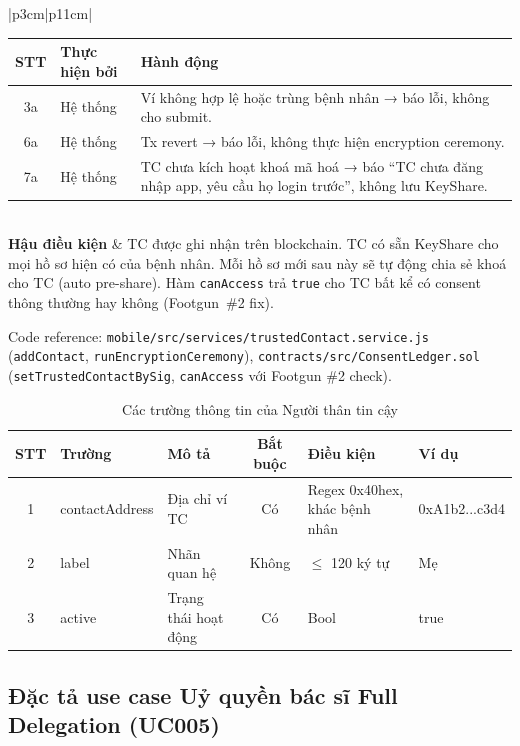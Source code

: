 \documentclass[../DoAn]{subfiles}
\begin{document}
\begin{table}[H]
\begin{tabular}{|p{3cm}|p{11cm}|}
\begin{tabular}{|c|p{2.3cm}|p{6cm}|}
\hline
\textbf{STT} & \textbf{Thực hiện bởi} & \textbf{Hành động} \\ \hline
3a & Hệ thống & Ví không hợp lệ hoặc trùng bệnh nhân → báo lỗi, không cho submit. \\ \hline
6a & Hệ thống & Tx revert → báo lỗi, không thực hiện encryption ceremony. \\ \hline
7a & Hệ thống & TC chưa kích hoạt khoá mã hoá → báo ``TC chưa đăng nhập app, yêu cầu họ login trước'', không lưu KeyShare. \\ \hline
\end{tabular} \\ \hline
\textbf{Hậu điều kiện} & TC được ghi nhận trên blockchain. TC có sẵn KeyShare cho mọi hồ sơ hiện có của bệnh nhân. Mỗi hồ sơ mới sau này sẽ tự động chia sẻ khoá cho TC (auto pre-share). Hàm \texttt{canAccess} trả \texttt{true} cho TC bất kể có consent thông thường hay không (Footgun~\#2 fix). \\ \hline
\end{tabular}
\end{table}

Code reference: \texttt{mobile/src/services/trustedContact.service.js} (\texttt{addContact}, \texttt{runEncryptionCeremony}), \texttt{contracts/src/ConsentLedger.sol} (\texttt{setTrustedContactBySig}, \texttt{canAccess} với Footgun \#2 check).

\begin{table}[H]
\centering
\caption{Các trường thông tin của Người thân tin cậy}
\label{tab:uc004-fields}
\small
\renewcommand{\arraystretch}{1.2}
\begin{tabular}{|c|p{2.8cm}|p{4cm}|c|p{2.3cm}|p{2.2cm}|}
\hline
\textbf{STT} & \textbf{Trường} & \textbf{Mô tả} & \textbf{Bắt buộc} & \textbf{Điều kiện} & \textbf{Ví dụ} \\ \hline
1 & contactAddress & Địa chỉ ví TC & Có & Regex 0x40hex, khác bệnh nhân & 0xA1b2...c3d4 \\ \hline
2 & label & Nhãn quan hệ & Không & $\le$ 120 ký tự & Mẹ \\ \hline
3 & active & Trạng thái hoạt động & Có & Bool & true \\ \hline
\end{tabular}
\end{table}

\subsection{Đặc tả use case Uỷ quyền bác sĩ Full Delegation (UC005)}
\end{document}
